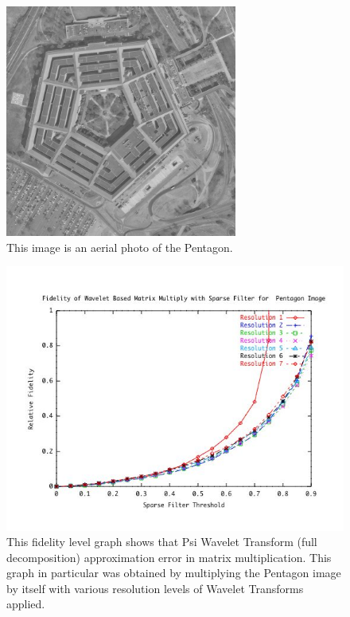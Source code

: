 \begin{figure}[ht]
\begin{center}\includegraphics [width=3in]{pentagon.jpg}\end{center}
\caption{This image is an aerial photo of the Pentagon.} %
\label{imagepentagon}
\end{figure}

\begin{figure}[ht]
\begin{center}\includegraphics [width=5in]{pentagonresultsA.jpg}\end{center}
\caption{This fidelity level graph shows that Psi Wavelet Transform (full decomposition) approximation error in matrix multiplication.  This graph in particular was obtained by multiplying the Pentagon image by itself with various resolution levels of Wavelet Transforms applied. }
\label{imagepentagonFidelity}
\end{figure}

